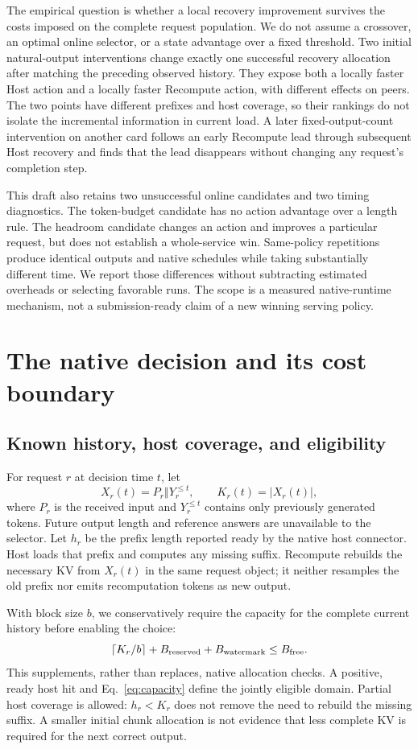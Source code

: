 \documentclass[10pt,a4paper]{article}
\begin{document}
The empirical question is whether a local recovery improvement survives the
costs imposed on the complete request population. We do not assume a crossover,
an optimal online selector, or a state advantage over a fixed threshold.
Two initial natural-output interventions change exactly one
successful recovery allocation after matching the preceding observed history.
They expose both a locally faster Host action and a locally faster Recompute
action, with different effects on peers. The two points have different prefixes
and host coverage, so their rankings do not isolate the incremental information
in current load. A later fixed-output-count intervention on another card follows
an early Recompute lead through subsequent Host recovery and finds that the
lead disappears without changing any request's completion step.

This draft also retains two unsuccessful online candidates and two timing
diagnostics. The token-budget candidate has no action advantage over a length
rule. The headroom candidate changes an action and improves a particular
request, but does not establish a whole-service win. Same-policy repetitions
produce identical outputs and native schedules while taking substantially
different time. We report those differences without subtracting estimated
overheads or selecting favorable runs. The scope is a measured native-runtime
mechanism, not a submission-ready claim of a new winning serving policy.

\section{The native decision and its cost boundary}
\subsection{Known history, host coverage, and eligibility}
For request $r$ at decision time $t$, let
\[
 X_r(t)=P_r\Vert Y_r^{\leq t},\qquad K_r(t)=|X_r(t)|,
\]
where $P_r$ is the received input and $Y_r^{\leq t}$ contains only previously
generated tokens. Future output length and reference answers are unavailable to
the selector. Let $h_r$ be the prefix length reported ready by the native host
connector. Host loads that prefix and computes any missing suffix. Recompute
rebuilds the necessary KV from $X_r(t)$ in the same request object; it neither
resamples the old prefix nor emits recomputation tokens as new output.

With block size $b$, we conservatively require the capacity for the complete
current history before enabling the choice:
\begin{equation}
 \left\lceil K_r/b\right\rceil+B_{\rm reserved}+B_{\rm watermark}
 \leq B_{\rm free}.
 \label{eq:capacity}
\end{equation}
This supplements, rather than replaces, native allocation checks. A positive,
ready host hit and Eq.~\ref{eq:capacity} define the jointly eligible domain.
Partial host coverage is allowed: $h_r<K_r$ does not remove the need to rebuild
the missing suffix. A smaller initial chunk allocation is not evidence that
less complete KV is required for the next correct output.
\end{document}

